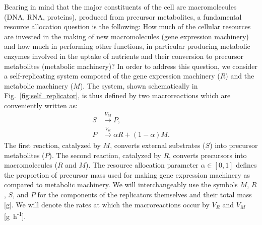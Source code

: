 Bearing in mind that the major constituents of the cell are mac\-ro\-mol\-e\-cules (DNA, RNA, proteins), produced from precursor metabolites, a fundamental resource allocation question is the following: How much of the cellular resources are invested in the making of new macromolecules (gene expression machinery) and how much in performing other functions, in particular producing metabolic enzymes involved in the uptake of nutrients and their conversion to precursor metabolites (metabolic machinery)?
In order to address this question, we consider a self-replicating system composed of the gene expression machinery ($R$) and the metabolic machinery ($M$).
The system, shown schematically in Fig.~\ref{fig:self_replicator}, is thus defined by two macroreactions which are conveniently written as:
\begin{equation}\label{eq:reactions}
\begin{aligned}
S &\overset{V_M}{\longrightarrow} P, \\
P &\overset{V_R}{\longrightarrow} \alpha R + (1-\alpha) M.
\end{aligned}
\end{equation}
The first reaction, catalyzed by $M$, converts external substrates ($S$) into precursor metabolites ($P$).
The second reaction, catalyzed by $R$, converts precursors into macromolecules ($R$ and $M$).
The resource allocation parameter $\alpha \in [0,1]$ defines the proportion of precursor mass used for making gene expression machinery as compared to metabolic machinery.
We will interchangeably use the symbols $M$, $R$, $S$, and $P$ for the components of the replicators themselves and their total mass [g].
We will denote the rates at which the macroreactions occur by $V_R$ and $V_M$ [g~h\textsuperscript{-1}].

